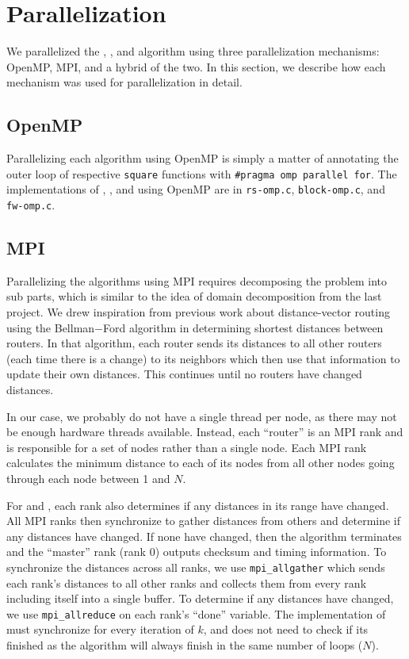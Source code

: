 \section{Parallelization}\label{sec:parallelization}
We parallelized the \rs{}, \block{}, and \fw{} algorithm using three
parallelization mechanisms: OpenMP, MPI, and a hybrid of the two. In this
section, we describe how each mechanism was used for parallelization in detail.

\subsection{OpenMP}
Parallelizing each algorithm using OpenMP is simply a matter of annotating the
outer loop of respective \texttt{square} functions with
\texttt{\#pragma omp parallel for}. The implementations of \rs{}, \block{}, and
\fw{} using OpenMP are in \texttt{rs-omp.c}, \texttt{block-omp.c}, and
\texttt{fw-omp.c}.

\subsection{MPI}
Parallelizing the algorithms using MPI requires decomposing the problem into sub
parts, which is similar to the idea of domain decomposition from the last project. We
drew inspiration from previous work about distance-vector routing using
the Bellman$-$Ford algorithm in determining shortest distances between routers. In that
algorithm, each router sends its distances to all other routers (each time
there is a change) to its neighbors which then use that information to update
their own distances. This continues until no routers have changed distances.

In our case, we probably do not have a single thread per node, as there may
not be enough hardware threads available. Instead, each ``router'' is an MPI
rank and is responsible for a set of nodes rather than a single node. Each MPI
rank calculates the minimum distance to each of its nodes from all other nodes
going through each node between 1 and $N$.

For \rs{} and \block{}, each rank also determines if any distances in its range have
changed. All MPI ranks then synchronize to gather distances from others
and determine if any distances have changed. If none have changed, then the
algorithm terminates and the ``master'' rank (rank 0) outputs checksum and
timing information. To synchronize the distances across all ranks, 
we use \texttt{mpi\_allgather} which sends each rank's distances to all other ranks 
and collects them from every rank including itself into a single buffer.
To determine if any distances have changed, we use
\texttt{mpi\_allreduce} on each rank's ``done'' variable.  The implementation of \fw{} must synchronize for
every iteration of $k$, and does not need to check if its finished as the
algorithm will always finish in the same number of loops ($N$).

